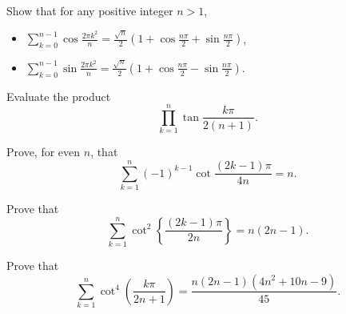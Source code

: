 \documentclass[12pt,a4paper]{memoir}
\theoremstyle{definition}
\begin{document}
\begin{question} Show that for any positive integer $n>1$,
	
	\begin{itemize}
		
		\item $\displaystyle \sum_{k=0}^{n-1}\cos\frac{2\pi k^{2}}{n}=\frac{\sqrt{n}}{2}\left(1+\cos\frac{n\pi}{2}+\sin\frac{n\pi}{2}\right)$,
		
		\item $\displaystyle \sum_{k=0}^{n-1}\sin\frac{2\pi k^{2}}{n}=\frac{\sqrt{n}}{2}\left(1+\cos\frac{n\pi}{2}-\sin\frac{n\pi}{2}\right)$.
		
	\end{itemize}
\end{question}

\begin{question} Evaluate the product
	\[ \prod_{k=1}^{n}\tan\frac{k\pi}{2(n+1)}.\]
\end{question}

\begin{question} Prove, for even $n$, that $$\sum_{k=1}^{n}(-1)^{k-1}\cot\frac{(2k-1)\pi}{4n}=n.$$
\end{question}

\begin{question} Prove that $$\sum_{k=1}^{n}\cot^{2}\left\{\frac{(2k-1)\pi}{2n}\right\}=n(2n-1).$$
\end{question}


\begin{question} Prove that $$\sum_{k=1}^{n}\cot^{4}\left(\frac{k\pi}{2n+1}\right)=\frac{n(2n-1)(4n^{2}+10n-9)}{45}.$$
\end{question}

\end{document}
